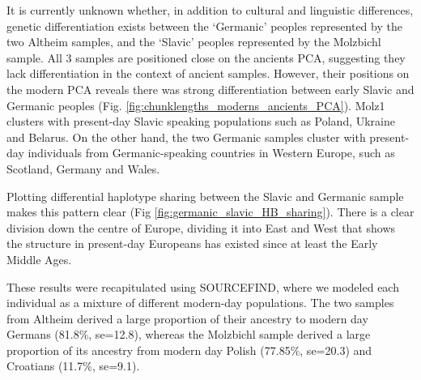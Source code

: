 It is currently unknown whether, in addition to cultural and linguistic differences, genetic differentiation exists between the `Germanic’ peoples represented by the two Altheim samples, and the `Slavic’ peoples represented by the Molzbichl sample. All 3 samples are positioned close on the ancients PCA, suggesting they lack differentiation in the context of ancient samples. However, their positions on the modern PCA reveals there was strong differentiation between early Slavic and Germanic peoples (Fig. \ref{fig:chunklengths_moderns_ancients_PCA}). Molz1 clusters with present-day Slavic speaking populations such as Poland, Ukraine and Belarus. On the other hand, the two Germanic samples cluster with present-day individuals from Germanic-speaking countries in Western Europe, such as Scotland, Germany and Wales. 

Plotting differential haplotype sharing between the Slavic and Germanic sample makes this pattern clear (Fig \ref{fig:germanic_slavic_HB_sharing}). There is a clear division down the centre of Europe, dividing it into East and West that shows the structure in present-day Europeans has existed since at least the Early Middle Ages. 

These results were recapitulated using SOURCEFIND, where we modeled each individual as a mixture of different modern-day populations. The two samples from Altheim derived a large proportion of their ancestry to modern day Germans (81.8\%, se=12.8), whereas the Molzbichl sample derived a large proportion of its ancestry from modern day Polish (77.85\%, se=20.3) and Croatians (11.7\%, se=9.1). 

